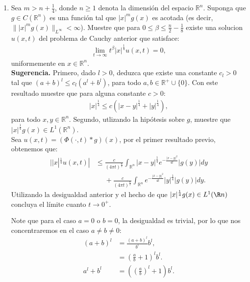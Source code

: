 \begin{homeworkProblem}
\begin{enumerate}
\begin{solucion}
      \demostrado
    \end{solucion}
    \newpage
    \item Sea $m>n+\frac{1}{4}$, donde $n\geq 1$ denota la dimensión del espacio $\mathbb{R}^{n}$. Suponga que $g\in C(\mathbb{R}^{n})$ es una función tal que $|x|^mg(x)$ es acotada (es decir, $\||x|^mg(x)\|_{L^{\infty}}<\infty$). Muestre que para $0 \leq \beta \leq \frac{n}{2}-\frac{1}{8}$ existe una solucion $u(x,t)$ del problema de Cauchy anterior que satisface:
      \begin{align*}
        \lim_{t \rightarrow \infty}t^{\beta}|x|^{\frac{1}{4}}u(x,t)=0,
      \end{align*}
      uniformemente en $x\in\mathbb{R}^{n}$.\\
      \textbf{Sugerencia.} Primero, dado $l>0$, deduzca que existe una constante $c_l>0$ tal que $(a+b)^{l}\leq c_l(a^l+b^l)$, para todo $a,b\in\mathbb{R}^{+}\cup\{0\}$. Con este resultado muestre que para alguna constante $c>0$:
      \begin{align*}
        |x|^{\frac{1}{4}}\leq c(|x-y|^{\frac{1}{4}}+|y|^{\frac{1}{4}}),
      \end{align*}
      para todo $x,y\in\mathbb{R}^{n}$. Segundo, utlizando la hipótesis sobre $g$, muestre que $|x|^{\frac{1}{4}}g(x)\in L^{1}(\mathbb{R}^{n}).$\\
      Sea $u(x,t)=(\Phi(\cdot,t)*g)(x)$, por el primer resultado previo, obtenemos que:
      \begin{align*}
        ||x|^{\frac{1}{4}}u(x,t)|&\leq \frac{c}{(4\pi t)^{\frac{n}{2}}}\int_{\mathbb{R}^{n}}|x-y|^{\frac{1}{4}}e^{-\frac{|x-y|^2}{4t}}|g(y)|dy\\
        &\phantom{=} + \frac{c}{(4\pi t)^{\frac{n}{2}}}\int_{\mathbb{R}^{n}}e^{-\frac{|x-y|^2}{4t}}|y|^{\frac{1}{4}}|g(y)|dy.
      \end{align*}
      Utilizando la desigualdad anterior y el hecho de que $|x|^{\frac{1}{4}}g(x)\in L^{1}(\R
      n)$ concluya el límite cuanto $t\rightarrow 0^{+}$.
    \begin{solucion}
      Note que para el caso $a=0$ o $b=0$, la desigualdad es trivial, por lo que nos concentraremos en el caso $a\neq b\neq 0$:
      \begin{align*}
        (a+b)^{l}&=\frac{(a+b)^l}{b^l}b^l,\\
        &=\left( \frac{a}{b}+1 \right)^{l}b^l.\\
        a^l+b^l&=\left(\left(\frac{a}{b}\right)^l+1\right)b^l.
      \end{align*}

\end{solucion}
\end{enumerate}
\end{homeworkProblem}
